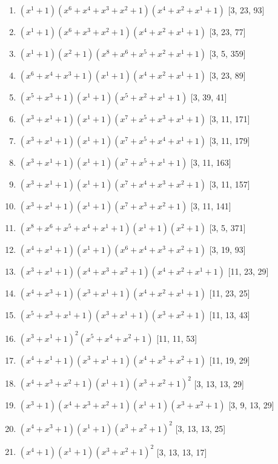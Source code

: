 \documentclass[10pt,twocolumn]{article}
\begin{document}
\begin{enumerate}
\item $(x^{1} + 1)(x^{6} + x^{4} + x^{3} + x^{2} + 1)(x^{4} + x^{2} + x^{1} + 1)$  [3, 23, 93]
\item $(x^{1} + 1)(x^{6} + x^{3} + x^{2} + 1)(x^{4} + x^{2} + x^{1} + 1)$  [3, 23, 77]
\item $(x^{1} + 1)(x^{2} + 1)(x^{8} + x^{6} + x^{5} + x^{2} + x^{1} + 1)$  [3, 5, 359]
\item $(x^{6} + x^{4} + x^{3} + 1)(x^{1} + 1)(x^{4} + x^{2} + x^{1} + 1)$  [3, 23, 89]
\item $(x^{5} + x^{3} + 1)(x^{1} + 1)(x^{5} + x^{2} + x^{1} + 1)$  [3, 39, 41]
\item $(x^{3} + x^{1} + 1)(x^{1} + 1)(x^{7} + x^{5} + x^{3} + x^{1} + 1)$  [3, 11, 171]
\item $(x^{3} + x^{1} + 1)(x^{1} + 1)(x^{7} + x^{5} + x^{4} + x^{1} + 1)$  [3, 11, 179]
\item $(x^{3} + x^{1} + 1)(x^{1} + 1)(x^{7} + x^{5} + x^{1} + 1)$  [3, 11, 163]
\item $(x^{3} + x^{1} + 1)(x^{1} + 1)(x^{7} + x^{4} + x^{3} + x^{2} + 1)$  [3, 11, 157]
\item $(x^{3} + x^{1} + 1)(x^{1} + 1)(x^{7} + x^{3} + x^{2} + 1)$  [3, 11, 141]
\item $(x^{8} + x^{6} + x^{5} + x^{4} + x^{1} + 1)(x^{1} + 1)(x^{2} + 1)$  [3, 5, 371]
\item $(x^{4} + x^{1} + 1)(x^{1} + 1)(x^{6} + x^{4} + x^{3} + x^{2} + 1)$  [3, 19, 93]
\item $(x^{3} + x^{1} + 1)(x^{4} + x^{3} + x^{2} + 1)(x^{4} + x^{2} + x^{1} + 1)$  [11, 23, 29]
\item $(x^{4} + x^{3} + 1)(x^{3} + x^{1} + 1)(x^{4} + x^{2} + x^{1} + 1)$  [11, 23, 25]
\item $(x^{5} + x^{3} + x^{1} + 1)(x^{3} + x^{1} + 1)(x^{3} + x^{2} + 1)$  [11, 13, 43]
\item $(x^{3} + x^{1} + 1)^{2}(x^{5} + x^{4} + x^{2} + 1)$  [11, 11, 53]
\item $(x^{4} + x^{1} + 1)(x^{3} + x^{1} + 1)(x^{4} + x^{3} + x^{2} + 1)$  [11, 19, 29]
\item $(x^{4} + x^{3} + x^{2} + 1)(x^{1} + 1)(x^{3} + x^{2} + 1)^{2}$  [3, 13, 13, 29]
\item $(x^{3} + 1)(x^{4} + x^{3} + x^{2} + 1)(x^{1} + 1)(x^{3} + x^{2} + 1)$  [3, 9, 13, 29]
\item $(x^{4} + x^{3} + 1)(x^{1} + 1)(x^{3} + x^{2} + 1)^{2}$  [3, 13, 13, 25]
\item $(x^{4} + 1)(x^{1} + 1)(x^{3} + x^{2} + 1)^{2}$  [3, 13, 13, 17]

\end{enumerate}
\end{document}
